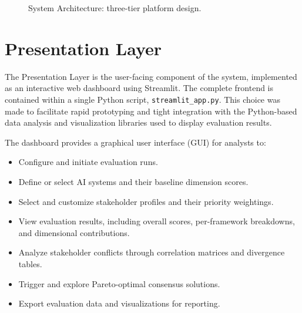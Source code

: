 \begin{figure}[H]
\caption{System Architecture: three-tier platform design.}
\label{fig:architecture}
\end{figure}

\section{Presentation Layer}
\label{sec:presentation}

The Presentation Layer is the user-facing component of the system, implemented as an interactive web dashboard using Streamlit. The complete frontend is contained within a single Python script, \texttt{streamlit\_app.py}. This choice was made to facilitate rapid prototyping and tight integration with the Python-based data analysis and visualization libraries used to display evaluation results.

The dashboard provides a graphical user interface (GUI) for analysts to:

\begin{itemize}[leftmargin=2em]
  \item Configure and initiate evaluation runs.
  \item Define or select AI systems and their baseline dimension scores.
  \item Select and customize stakeholder profiles and their priority weightings.
  \item View evaluation results, including overall scores, per-framework breakdowns, and dimensional contributions.
  \item Analyze stakeholder conflicts through correlation matrices and divergence tables.
  \item Trigger and explore Pareto-optimal consensus solutions.
  \item Export evaluation data and visualizations for reporting.
\end{itemize}

